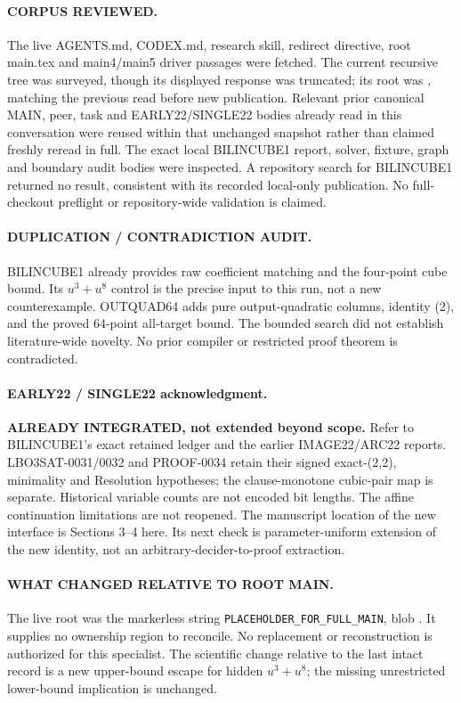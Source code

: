 \documentclass[11pt]{article}
\begin{document}
\paragraph{CORPUS REVIEWED.}
The live AGENTS.md, CODEX.md, research skill, redirect directive, root main.tex
and main4/main5 driver passages were fetched. The current recursive tree was
surveyed, though its displayed response was truncated; its root was
, matching the previous read
before new publication. Relevant prior canonical MAIN, peer, task and
EARLY22/SINGLE22 bodies already read in this conversation were reused within
that unchanged snapshot rather than claimed freshly reread in full.
The exact local BILINCUBE1 report, solver, fixture, graph and boundary audit
bodies were inspected. A repository search for BILINCUBE1 returned no result,
consistent with its recorded local-only publication. No full-checkout preflight
or repository-wide validation is claimed.

\paragraph{DUPLICATION / CONTRADICTION AUDIT.}
BILINCUBE1 already provides raw coefficient matching and the four-point cube
bound. Its $u^3+u^8$ control is the precise input to this run, not a new
counterexample. OUTQUAD64 adds pure output-quadratic columns, identity (2),
and the proved 64-point all-target bound. The bounded search did not establish
literature-wide novelty. No prior compiler or restricted proof theorem is
contradicted.

\paragraph{EARLY22 / SINGLE22 acknowledgment.}
\textbf{ALREADY INTEGRATED, not extended beyond scope.} Refer to BILINCUBE1's
exact retained ledger and the earlier IMAGE22/ARC22 reports. LBO3SAT-0031/0032
and PROOF-0034 retain their signed exact-(2,2), minimality and Resolution
hypotheses; the clause-monotone cubic-pair map is separate. Historical variable
counts are not encoded bit lengths. The affine continuation limitations are
not reopened. The manuscript location of the new interface is Sections 3--4
here. Its next check is parameter-uniform extension of the new identity, not
an arbitrary-decider-to-proof extraction.

\paragraph{WHAT CHANGED RELATIVE TO ROOT MAIN.}
The live root was the markerless string \texttt{PLACEHOLDER\_FOR\_FULL\_MAIN},
blob . It supplies no ownership
region to reconcile. No replacement or reconstruction is authorized for this
specialist. The scientific change relative to the last intact record is a new
upper-bound escape for hidden $u^3+u^8$; the missing unrestricted lower-bound
implication is unchanged.
\end{document}
